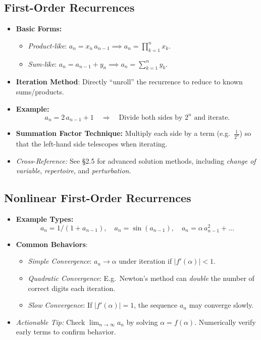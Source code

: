 \documentclass[11pt,letterpaper]{article}
\begin{document}
\subsection{First-Order Recurrences}
\begin{itemize}
  \item \textbf{Basic Forms:}
    \begin{itemize}
      \item \emph{Product-like}: \(a_n = x_n \, a_{n-1} \implies a_n = \prod_{k=1}^n x_k\).
      \item \emph{Sum-like}: \(a_n = a_{n-1} + y_n \implies a_n = \sum_{k=1}^n y_k\).
    \end{itemize}
  \item \textbf{Iteration Method}: Directly “unroll” the recurrence to reduce to known sums/products.
  \item \textbf{Example:} 
    \[
      a_n = 2\,a_{n-1} + 1
      \quad\Longrightarrow\quad
      \text{Divide both sides by } 2^n \text{ and iterate.}
    \]
  \item \textbf{Summation Factor Technique:} Multiply each side by a term (e.g.\ \(\frac{1}{2^n}\)) so that the left-hand side telescopes when iterating.
  \item \emph{Cross-Reference:} See \S2.5 for advanced solution methods, including \emph{change of variable}, \emph{repertoire}, and \emph{perturbation}.
\end{itemize}

\subsection{Nonlinear First-Order Recurrences}
\begin{itemize}
  \item \textbf{Example Types:} 
    \[
      a_n = 1/(1 + a_{n-1}), 
      \quad a_n = \sin(a_{n-1}), 
      \quad a_n = \alpha\, a_{n-1}^2 + \ldots
    \]
  \item \textbf{Common Behaviors}:
    \begin{itemize}
      \item \textit{Simple Convergence}: \(a_n \to \alpha\) under iteration if \(|f'(\alpha)| < 1\).
      \item \textit{Quadratic Convergence}: E.g.\ Newton’s method can \emph{double} the number of correct digits each iteration.
      \item \textit{Slow Convergence}: If \(|f'(\alpha)| = 1\), the sequence \(a_n\) may converge slowly.
    \end{itemize}
  \item \emph{Actionable Tip:} Check \(\lim_{n \to \infty} a_n\) by solving \(\alpha = f(\alpha)\). Numerically verify early terms to confirm behavior.
\end{itemize}
\end{document}

